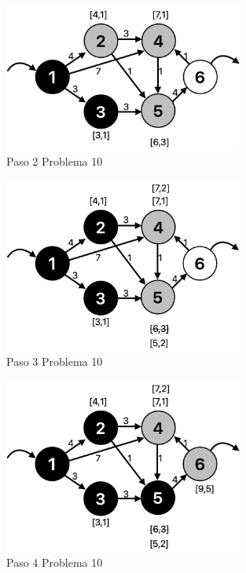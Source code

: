 \documentclass[12pt]{article}  %
\begin{document}
\begin{figure}[H]
\centering
\caption{Paso 2 Problema 10}
\label{fig:paso2Prob10}
\includegraphics[width=0.7\textwidth]{paso2Prob10.png}
\end{figure}

\begin{figure}[H]
\centering
\caption{Paso 3 Problema 10}
\label{fig:paso3Prob10}
\includegraphics[width=0.7\textwidth]{paso3Prob10.png}
\end{figure}

\begin{figure}[H]
\centering
\caption{Paso 4 Problema 10}
\label{fig:paso4Prob10}
\includegraphics[width=0.7\textwidth]{paso4Prob10.png}
\end{figure}
\end{document}
